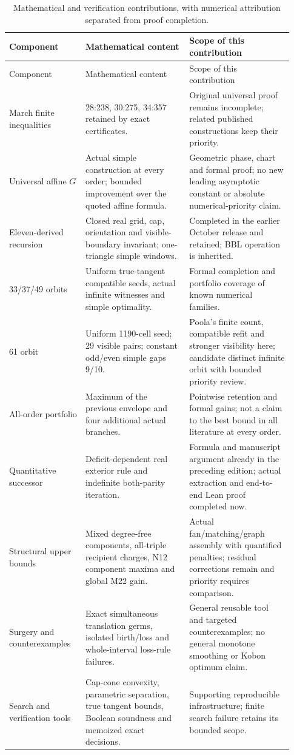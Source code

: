 \begin{longtable}{@{}P{0.25\linewidth}P{0.34\linewidth}P{0.34\linewidth}@{}}
\caption{Mathematical and verification contributions, with numerical
attribution separated from proof completion.}\label{discussion:contributions}\\
\toprule Component & Mathematical content & Scope of this contribution\\\midrule\endfirsthead
\toprule Component & Mathematical content & Scope of this contribution\\\midrule\endhead
\bottomrule\endfoot
March finite inequalities & 28:238, 30:275, 34:357 retained by exact
certificates. & Original universal proof remains incomplete; related
published constructions keep their priority.\\
Universal affine $G$ & Actual simple construction at every order;
bounded improvement over the quoted affine formula. & Geometric phase,
chart and formal proof; no new leading asymptotic constant or absolute
numerical-priority claim.\\
Eleven-derived recursion & Closed real grid, cap, orientation and
visible-boundary invariant; one-triangle simple windows. & Completed in
the earlier October release and retained; BBL operation is inherited.\\
33/37/49 orbits & Uniform true-tangent compatible seeds, actual infinite
witnesses and simple optimality. & Formal completion and portfolio
coverage of known numerical families.\\
61 orbit & Uniform 1190-cell seed; 29 visible pairs; constant odd/even
simple gaps 9/10. & Poola's finite count, compatible refit and stronger
visibility here; candidate distinct infinite orbit with bounded priority
review.\\
All-order portfolio & Maximum of the previous envelope and four
additional actual branches. & Pointwise retention and formal gains;
not a claim to the best bound in all literature at every order.\\
Quantitative successor & Deficit-dependent real exterior rule and
indefinite both-parity iteration. & Formula and manuscript argument
already in the preceding edition; actual extraction and end-to-end Lean
proof completed now.\\
Structural upper bounds & Mixed degree-free components, all-triple
recipient charges, N12 component maxima and global M22 gain. & Actual
fan/matching/graph assembly with quantified penalties; residual corrections
remain and priority requires comparison.\\
Surgery and counterexamples & Exact simultaneous translation germs,
isolated birth/loss and whole-interval loss-rule failures. & General
reusable tool and targeted counterexamples; no general monotone smoothing
or Kobon optimum claim.\\
Search and verification tools & Cap-cone convexity, parametric separation,
true tangent bounds, Boolean soundness and memoized exact decisions. &
Supporting reproducible infrastructure; finite search failure retains
its bounded scope.\\
\end{longtable}

